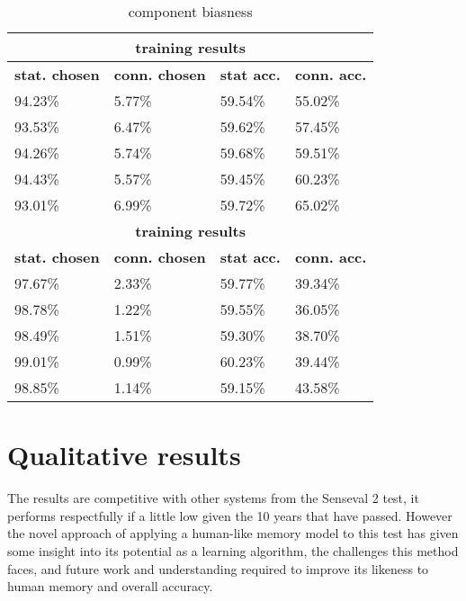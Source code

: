 \begin{table}[htp]
	\begin{tabular}{|l|l|l|l|}
		\hline
		\multicolumn{4}{|c|}{\bf training results } \\ \hline
		{\bf stat. chosen } & {\bf conn. chosen } & {\bf stat acc.} & {\bf conn. acc.}\\ \hline
		94.23\%             & 5.77\%              &  59.54\%        & 55.02\% \\ \hline
		93.53\%             & 6.47\%              &  59.62\%        & 57.45\% \\ \hline
		94.26\%             & 5.74\%              &  59.68\%        & 59.51\% \\ \hline
		94.43\%             & 5.57\%              &  59.45\%        & 60.23\% \\ \hline
		93.01\%             & 6.99\%              &  59.72\%        & 65.02\% \\ \hline
	    \multicolumn{4}{|c|}{\bf training results } \\ \hline
		{\bf stat. chosen } & {\bf conn. chosen } & {\bf stat acc.} & {\bf conn. acc.}\\ \hline
		97.67\%             & 2.33\%              &  59.77\%        & 39.34\% \\ \hline
		98.78\%             & 1.22\%              &  59.55\%        & 36.05\% \\ \hline
		98.49\%             & 1.51\%              &  59.30\%        & 38.70\% \\ \hline
		99.01\%             & 0.99\%              &  60.23\%        & 39.44\% \\ \hline
		98.85\%             & 1.14\%              &  59.15\%        & 43.58\% \\ \hline
	\end{tabular}
	\caption{component biasness}
	\label{table:BIASNESS}
\end{table}

\section{Qualitative results}

The results are competitive with other systems from the Senseval 2 test, it performs respectfully if a little low given the 10 years that have passed.  However the novel approach of applying a human-like memory model to this test has given some insight into its potential as a learning algorithm, the challenges this method faces, and future work and understanding required to improve its likeness to human memory and overall accuracy.

